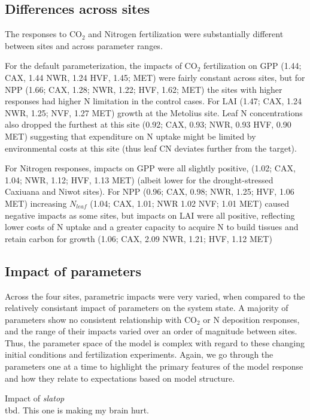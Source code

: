 \documentclass[draft,linenumbers]{agujournal}
\begin{document}
\subsection{Differences across sites}
The responses to CO$_{2}$ and Nitrogen fertilization were substantially different between sites and across parameter ranges. 

For the default parameterization, the impacts of CO$_{2}$ fertilization on  GPP (1.44; CAX, 1.44 NWR, 1.24 HVF, 1.45; MET) were fairly constant across sites, but for NPP (1.66; CAX, 1.28; NWR, 1.22; HVF, 1.62; MET) the sites with higher responses had higher N limitation in the control cases.  For LAI (1.47; CAX, 1.24 NWR, 1.25; NVF, 1.27 MET) growth at the Metolius site. Leaf N concentrations also dropped the furthest at this site (0.92; CAX, 0.93; NWR, 0.93 HVF, 0.90 MET) suggesting that expenditure on N uptake might be limited by environmental costs at this site (thus leaf CN deviates further from the target). 

For Nitrogen responses, impacts on  GPP were all slightly positive, (1.02; CAX, 1.04; NWR, 1.12; HVF, 1.13 MET) (albeit lower for the drought-stressed Caxiuana and Niwot sites).  For NPP (0.96; CAX, 0.98; NWR, 1.25; HVF, 1.06 MET) increasing $N_{leaf}$ (1.04; CAX, 1.01; NWR 1.02 NVF; 1.01 MET) caused negative impacts as some sites, but impacts on LAI were all positive, reflecting lower costs of N uptake and a greater capacity to acquire N to build tissues and retain carbon for growth (1.06; CAX, 2.09 NWR, 1.21; HVF, 1.12 MET) 

\subsection{Impact of parameters}
Across the four sites, parametric impacts were very varied, when compared to the relatively consistant impact of parameters on the system state. A majority of parameters show no consistent relationship with CO$_{2}$ or N deposition responses, and the range of their impacts varied over an order of magnitude between sites. Thus, the parameter space of the model is complex with regard to these changing initial conditions and fertilization experiments. Again, we go through the parameters one at a time to highlight the primary features of the model response and how they relate to expectations based on model structure. 

Impact of \emph{slatop}\\
 tbd. This one is making my brain hurt. 
\end{document}
